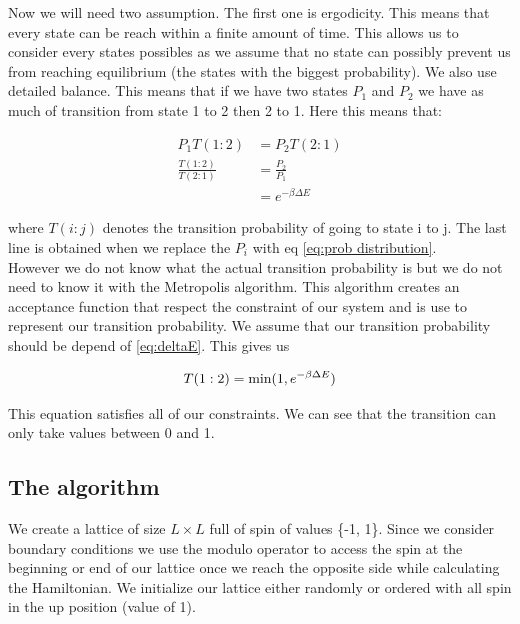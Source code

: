 \documentclass[english,notitlepage,reprint,nofootinbib]{revtex4-2}  %
\begin{document}
	
	Now we will need two assumption. The first one is ergodicity. This means that every state
	can be reach within a finite amount of time. This allows us to consider every states possibles
	as we assume that no state can possibly prevent us from reaching equilibrium (the states 
	with the biggest probability). We also use detailed balance. This means that if we have
	two states $P_1$ and $P_2$ we have as much of transition from state 1 to 2 then 2 to 1. Here
	this means that:
	
	\begin{align}
		P_1 T(1:2) &= P_2T(2:1) \\
		\frac{T(1:2)}{T(2:1)} &= \frac{P_2}{P_1} \\ 
		&= e^{-\beta \Delta E} \label{eq:deltaE}
	\end{align}

	where $T(i:j)$ denotes the transition probability of going to state i to j. The last line 
	is obtained when we replace the $P_i$ with eq \ref{eq:prob distribution}. \\
	
	However we do not know what the actual transition probability is but we do not need to know
	it with the Metropolis algorithm. This algorithm creates an acceptance function that respect
	the constraint of our system and is use to represent our transition probability. We assume 
	that our transition probability should be depend of \ref{eq:deltaE}. This gives us
	
	\begin{equation}
		T(1:2) = \text{min}(1, e^{-\beta \Delta E\\}) \label{eq:metropolis}
	\end{equation}
	
	
	This equation satisfies all of our constraints. We can see that the transition can only
	take values between 0 and 1. 
	
	\subsection*{The algorithm}\label{subsec:you suck eloi}
	
	We create a lattice of size $L \times L $ full of spin of values \{-1, 1\}. Since we 
	consider boundary conditions we use the modulo operator to access the spin at the beginning
	or end of our lattice once we reach the opposite side while calculating the Hamiltonian. We
	initialize our lattice either randomly or ordered with all spin in the up position (value
	of 1). \\
	
\end{document}
